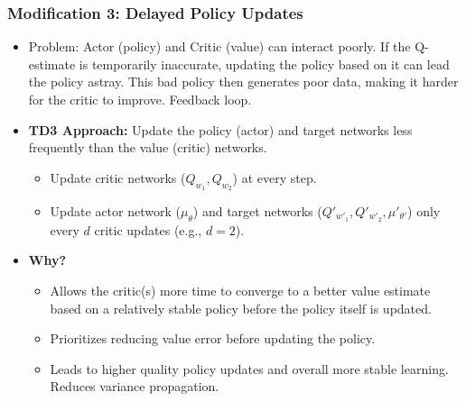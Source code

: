 \documentclass[9pt, aspectratio=169]{beamer}
\begin{document}
\begin{frame}
  \frametitle{Modification 3: Delayed Policy Updates}
    \begin{itemize}
        \item Problem: Actor (policy) and Critic (value) can interact poorly. If the Q-estimate is temporarily inaccurate, updating the policy based on it can lead the policy astray. This bad policy then generates poor data, making it harder for the critic to improve. Feedback loop.

        \item \textbf{TD3 Approach:} Update the policy (actor) and target networks less frequently than the value (critic) networks.
        \begin{itemize}
            \item Update critic networks ($Q_{w_1}, Q_{w_2}$) at every step.
            \item Update actor network ($\mu_\theta$) and target networks ($Q'_{w'_1}, Q'_{w'_2}, \mu'_{\theta'}$) only every $d$ critic updates (e.g., $d=2$).
        \end{itemize}

        \item \textbf{Why?}
        \begin{itemize}
            \item Allows the critic(s) more time to converge to a better value estimate based on a relatively stable policy before the policy itself is updated.
            \item Prioritizes reducing value error before updating the policy.
            \item Leads to higher quality policy updates and overall more stable learning. Reduces variance propagation.
        \end{itemize}
    \end{itemize}
\end{frame}
\end{document}
